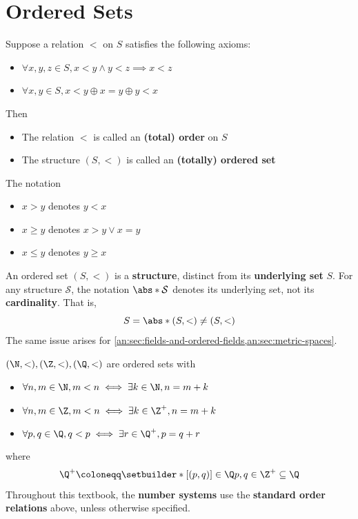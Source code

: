 \section{Ordered Sets}

\begin{definition} \label{an:def:ordered-set}
  Suppose a relation $<$ on $S$ satisfies the following axioms:
  \begin{itemize}
    \item $\forall x, y, z \in S, x < y \land y < z \implies x < z$
    \item $\forall x, y \in S, x < y \oplus x = y \oplus y < x$
  \end{itemize}
  Then
  \begin{itemize}
    \item The relation $<$ is called an \textbf{(total) order} on $S$
    \item The structure $(S, <)$ is called an \textbf{(totally) ordered set}
  \end{itemize}
  The notation
  \begin{itemize}
    \item $x > y$ denotes $y < x$
    \item $x \geq y$ denotes $x > y \lor x = y$
    \item $x \leq y$ denotes $y \geq x$
  \end{itemize}
\end{definition}

\bigskip

\begin{remark}
  An ordered set $(S, <)$ is a \textbf{structure}, distinct from its \textbf{underlying set} $S$.
  For any structure $\mathcal{S}$, the notation $\abs*{\mathcal{S}}$ denotes its underlying set,
  not its \textbf{cardinality}. That is,
  \[
    S = \abs*{(S, <)} \neq (S, <)
  \]
  The same issue arises for \cref{an:sec:fields-and-ordered-fields,an:sec:metric-spaces}.
\end{remark}

\bigskip

\begin{remark}
  $(\N, <), (\Z, <), (\Q, <)$ are ordered sets with
  \begin{itemize}
    \item $\forall n, m \in \N, m < n \iff \exists k \in \N, n = m + k$
    \item $\forall n, m \in \Z, m < n \iff \exists k \in \Z^{+}, n = m + k$
    \item $\forall p, q \in \Q, q < p \iff \exists r \in \Q^{+}, p = q + r$
  \end{itemize}
  where
  \[
    \Q^{+} \coloneqq \setbuilder*{[(p, q)] \in \Q}{p, q \in \Z^{+}} \subseteq \Q
  \]
  Throughout this textbook, the \textbf{number systems} use the
  \textbf{standard order relations} above, unless otherwise specified.
\end{remark}

